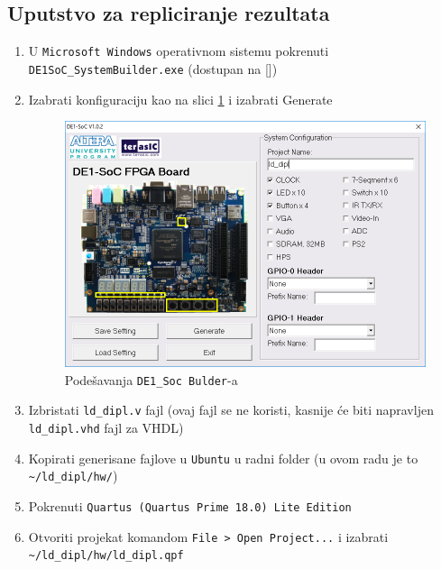 \newcommand\tab[1][1cm]{\hspace*{#1}}
\subsection{Uputstvo za repliciranje rezultata}

\begin{enumerate}

\subsubsection{Projektovanje u Quartus-u}
\item U \texttt{Microsoft Windows} operativnom sistemu pokrenuti \texttt{DE1SoC\_SystemBuilder.exe} (dostupan na [])
\item Izabrati konfiguraciju kao na slici \ref{slika:sb} i izabrati Generate\\
\begin{figure}[h!]
\centering
\includegraphics[scale=0.6]{img/DE1SoC_SystemBuilder.png}
\caption{Podešavanja \texttt{DE1\_Soc Bulder}-a}
\label{slika:sb}
\end{figure}
\item  Izbristati \texttt{ld\_dipl.v} fajl (ovaj fajl se ne koristi, kasnije će biti napravljen \texttt{ld\_dipl.vhd} fajl za VHDL)
\item  Kopirati generisane fajlove u \texttt{Ubuntu} u radni folder (u ovom radu je to \texttt{\textasciitilde/ld\_dipl/hw/})
\item  Pokrenuti \texttt{Quartus (Quartus Prime 18.0) Lite Edition}
\item  Otvoriti projekat komandom \texttt{File > Open Project...} i izabrati \texttt{\textasciitilde/ld\_dipl/hw/ld\_dipl.qpf}

\end{enumerate}

